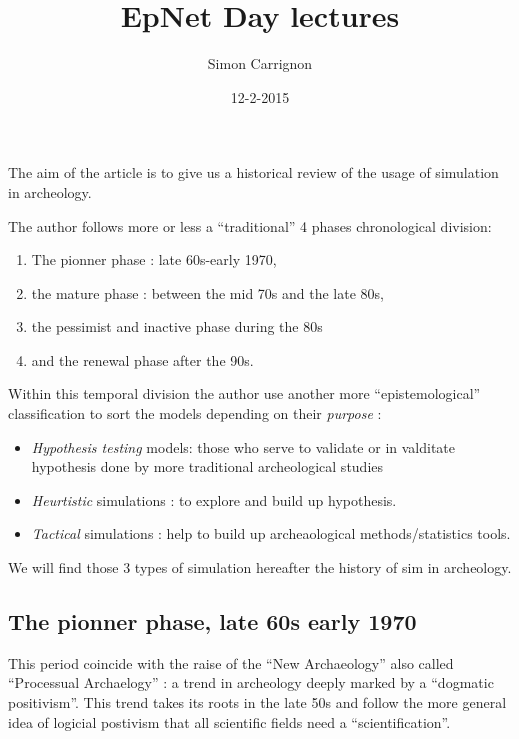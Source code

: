 \documentclass[a4paper]{article}
\title{EpNet Day lectures}
\author{Simon Carrignon}
\date{12-2-2015}
\begin{document}
\maketitle
\section{\cite{lake2014trendsinarchaeologicalsimulation}}
The aim of the article is to give us a historical review of the usage of simulation in archeology.

The author follows more or less a ``traditional'' 4 phases chronological division:
\begin{enumerate}
	\item The pionner phase : late 60s-early 1970,
	\item the mature phase : between the mid 70s and the late 80s,
	\item the pessimist and inactive phase during the 80s
	\item and the renewal phase after the 90s.
\end{enumerate}

Within this temporal division the author use another more ``epistemological'' classification to sort the models depending on their \emph{purpose} :

\begin{itemize}
	\item \emph{Hypothesis testing} models: those who serve to validate or in valditate hypothesis done by more traditional archeological studies
	\item \emph{Heurtistic} simulations :  to explore and build up hypothesis.
	\item \emph{Tactical} simulations : help to build up archeaological methods/statistics tools.
\end{itemize}

We will find those  3 types of simulation hereafter the history of sim in archeology.

\subsection{The pionner phase, late 60s early 1970}
This period coincide with the raise of the ``New Archaeology'' also called ``Processual Archaelogy'' : a trend in archeology deeply marked by a ``dogmatic positivism''. This trend takes its roots in the late 50s and follow the more general idea of logicial postivism that all scientific fields need a ``scientification''. 
\end{document}
